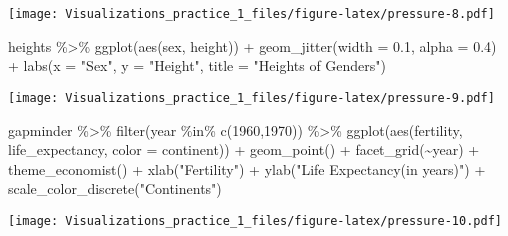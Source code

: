 \documentclass[
]{article}
\newenvironment{Shaded}{\begin{snugshade}}{\end{snugshade}}
\newcommand{\AttributeTok}[1]{\textcolor[rgb]{0.77,0.63,0.00}{#1}}
\newcommand{\DecValTok}[1]{\textcolor[rgb]{0.00,0.00,0.81}{#1}}
\newcommand{\FloatTok}[1]{\textcolor[rgb]{0.00,0.00,0.81}{#1}}
\newcommand{\FunctionTok}[1]{\textcolor[rgb]{0.00,0.00,0.00}{#1}}
\newcommand{\NormalTok}[1]{#1}
\newcommand{\SpecialCharTok}[1]{\textcolor[rgb]{0.00,0.00,0.00}{#1}}
\newcommand{\StringTok}[1]{\textcolor[rgb]{0.31,0.60,0.02}{#1}}
\begin{document}
\texttt{[image: Visualizations\_practice\_1\_files/figure-latex/pressure-8.pdf]}

\begin{Shaded}
\begin{Highlighting}[]
\NormalTok{heights }\SpecialCharTok{\%\textgreater{}\%} 
  \FunctionTok{ggplot}\NormalTok{(}\FunctionTok{aes}\NormalTok{(sex, height)) }\SpecialCharTok{+} \FunctionTok{geom\_jitter}\NormalTok{(}\AttributeTok{width =} \FloatTok{0.1}\NormalTok{, }\AttributeTok{alpha =} \FloatTok{0.4}\NormalTok{) }\SpecialCharTok{+} 
  \FunctionTok{labs}\NormalTok{(}\AttributeTok{x =} \StringTok{"Sex"}\NormalTok{, }\AttributeTok{y =} \StringTok{"Height"}\NormalTok{, }\AttributeTok{title =} \StringTok{"Heights of Genders"}\NormalTok{)}
\end{Highlighting}
\end{Shaded}

\texttt{[image: Visualizations\_practice\_1\_files/figure-latex/pressure-9.pdf]}

\begin{Shaded}
\begin{Highlighting}[]
\NormalTok{gapminder }\SpecialCharTok{\%\textgreater{}\%} 
  \FunctionTok{filter}\NormalTok{(year }\SpecialCharTok{\%in\%} \FunctionTok{c}\NormalTok{(}\DecValTok{1960}\NormalTok{,}\DecValTok{1970}\NormalTok{)) }\SpecialCharTok{\%\textgreater{}\%} \FunctionTok{ggplot}\NormalTok{(}\FunctionTok{aes}\NormalTok{(fertility, }
\NormalTok{  life\_expectancy, }\AttributeTok{color =}\NormalTok{ continent)) }\SpecialCharTok{+} \FunctionTok{geom\_point}\NormalTok{() }\SpecialCharTok{+} \FunctionTok{facet\_grid}\NormalTok{(}\SpecialCharTok{\textasciitilde{}}\NormalTok{year) }\SpecialCharTok{+} 
  \FunctionTok{theme\_economist}\NormalTok{() }\SpecialCharTok{+} \FunctionTok{xlab}\NormalTok{(}\StringTok{"Fertility"}\NormalTok{) }\SpecialCharTok{+} \FunctionTok{ylab}\NormalTok{(}\StringTok{"Life Expectancy(in years)"}\NormalTok{) }\SpecialCharTok{+} 
  \FunctionTok{scale\_color\_discrete}\NormalTok{(}\StringTok{"Continents"}\NormalTok{)}
\end{Highlighting}
\end{Shaded}

\texttt{[image: Visualizations\_practice\_1\_files/figure-latex/pressure-10.pdf]}
\end{document}
